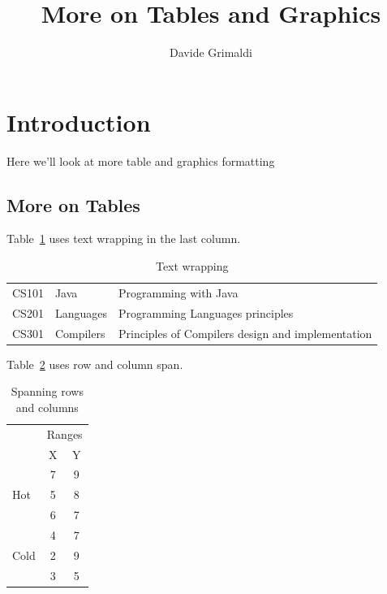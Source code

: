 \documentclass{article}
\title{More on Tables and Graphics}
\author{Davide Grimaldi}
\date{}
\begin{document}
    \maketitle
    \section{Introduction}
        Here we'll look at more table and graphics formatting

        \subsection{More on Tables}
            Table~\ref{tab:wrapping} uses text wrapping in the last column.
            \begin{table}[htbp]
                \caption{Text wrapping}
                \begin{center}
                    \begin{tabular}{| l | l | l |}
                        \hline
                        CS101 & Java & Programming with Java \\
                        CS201 & Languages & Programming Languages principles \\
                        CS301 & Compilers & Principles of Compilers design and implementation \\
                        \hline
                    \end{tabular}
                \end{center}
                \label{tab:wrapping}
            \end{table}

            Table~\ref{tab:multi} uses row and column span.
            \begin{table}[htbp]
                \caption{Spanning rows and columns}
                \begin{center}
                    \begin{tabular}{| l | c | c |}
                        \hline
                        & \multicolumn{2}{c|}{Ranges}\\ %
                        & X & Y\\
                        \hline
                        \multirow{3}{*}{Hot} & 7 & 9\\ %
                        & 5 & 8 \\
                        & 6 & 7 \\
                        \hline
                        \multirow{3}{*}{Cold} & 4 & 7\\ %
                        & 2 & 9 \\
                        & 3 & 5 \\
                        \hline
                    \end{tabular}
                \end{center}
                \label{tab:multi}
            \end{table}
\end{document}
